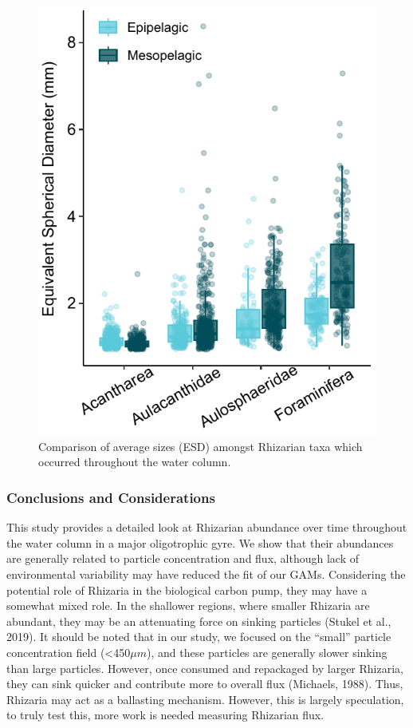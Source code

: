\documentclass[
]{article}
\begin{document}
\begin{figure}

{\centering \includegraphics{images/09_size-comp.pdf}

}

\caption{Comparison of average sizes (ESD) amongst Rhizarian taxa which
occurred throughout the water column.}

\end{figure}

\hypertarget{conclusions-and-considerations}{%
\subsubsection{Conclusions and
Considerations}\label{conclusions-and-considerations}}

This study provides a detailed look at Rhizarian abundance over time
throughout the water column in a major oligotrophic gyre. We show that
their abundances are generally related to particle concentration and
flux, although lack of environmental variability may have reduced the
fit of our GAMs. Considering the potential role of Rhizaria in the
biological carbon pump, they may have a somewhat mixed role. In the
shallower regions, where smaller Rhizaria are abundant, they may be an
attenuating force on sinking particles (Stukel et al., 2019). It should
be noted that in our study, we focused on the ``small'' particle
concentration field (\textless450\(\mu m\)), and these particles are
generally slower sinking than large particles. However, once consumed
and repackaged by larger Rhizaria, they can sink quicker and contribute
more to overall flux (Michaels, 1988). Thus, Rhizaria may act as a
ballasting mechanism. However, this is largely speculation, to truly
test this, more work is needed measuring Rhizarian flux.
\end{document}
